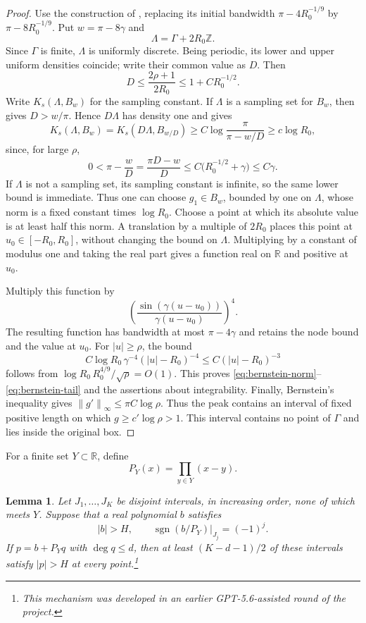 \documentclass[11pt]{article}
\newtheorem{lemma}[theorem]{Lemma}
\theoremstyle{definition}
\numberwithin{equation}{section}
\DeclareMathOperator{\sgn}{sgn}
\newcommand{\R}{\mathbb R}
\newcommand{\Z}{\mathbb Z}
\newcommand{\norm}[1]{\left\lVert #1\right\rVert}
\begin{document}
\begin{proof}
Use the construction of \cite[Lemma 4.1]{OU}, replacing its initial
bandwidth \(\pi-4R_0^{-1/9}\) by \(\pi-8R_0^{-1/9}\).
Put \(w=\pi-8\gamma\) and
\[
 \Lambda=\Gamma+2R_0\Z.
\]
Since \(\Gamma\) is finite, \(\Lambda\) is uniformly discrete. Being
periodic, its lower and upper uniform densities coincide; write their
common value as \(D\). Then
\[
 D\le\frac{2\rho+1}{2R_0}\le1+CR_0^{-1/2}.
\]
Write \(K_s(\Lambda,B_w)\) for the sampling constant. If \(\Lambda\)
is a sampling set for \(B_w\), then \cite[Theorem C(i)]{OU} gives
\(D>w/\pi\). Hence \(D\Lambda\) has density one and
\cite[Theorem 1(i)]{OU} gives
\[
 K_s(\Lambda,B_w)
 =K_s(D\Lambda,B_{w/D})
 \ge C\log\frac{\pi}{\pi-w/D}
 \ge c\log R_0,
\]
since, for large \(\rho\),
\[
 0<\pi-\frac wD=\frac{\pi D-w}{D}
 \le C\bigl(R_0^{-1/2}+\gamma\bigr)\le C\gamma.
\]
If \(\Lambda\) is not a sampling set,
its sampling constant is infinite, so the same lower bound is immediate.
Thus one can choose \(g_1\in B_w\), bounded by one on \(\Lambda\),
whose norm is a fixed constant times \(\log R_0\).
Choose a point at which its absolute value is at least half this norm.
A translation by a multiple of \(2R_0\) places this point at
\(u_0\in[-R_0,R_0]\), without changing the bound on \(\Lambda\).
Multiplying by a constant of modulus one and taking the real part
gives a function real on \(\R\) and positive at \(u_0\).

Multiply this function by
\[
 \left(\frac{\sin(\gamma(u-u_0))}
 {\gamma(u-u_0)}\right)^4.
\]
The resulting function has bandwidth at most \(\pi-4\gamma\) and
retains the node bound and the value at \(u_0\).
For \(|u|\ge\rho\), the bound
\[
 C\log R_0\,\gamma^{-4}(|u|-R_0)^{-4}
 \le C(|u|-R_0)^{-3}
\]
follows from
\(\log R_0\,R_0^{4/9}/\sqrt{\rho}=O(1)\).
This proves \eqref{eq:bernstein-norm}--\eqref{eq:bernstein-tail}
and the assertions about integrability.
Finally, Bernstein's inequality gives
\(\norm{g'}_\infty\le\pi C\log\rho\).
Thus the peak contains an interval of fixed positive length on which
\(g\ge c'\log\rho>1\). This interval contains no point of \(\Gamma\)
and lies inside the original box.
\end{proof}

For a finite set \(Y\subset\R\), define
\[
 P_Y(x)=\prod_{y\in Y}(x-y).
\]

\begin{lemma}\label{lem:signs}
Let \(J_1,\ldots,J_K\) be disjoint intervals, in increasing order,
none of which meets \(Y\). Suppose that a real polynomial \(b\)
satisfies
\begin{equation}\label{eq:alternating-data}
 |b|>H,
 \qquad
 \sgn(b/P_Y)|_{J_j}=(-1)^j.
\end{equation}
If \(p=b+P_Yq\) with \(\deg q\le d\), then at least
\((K-d-1)/2\) of these intervals satisfy \(|p|>H\) at every point.\footnote{This mechanism was developed in an earlier GPT-5.6-assisted round of the project.}
\end{lemma}
\end{document}
